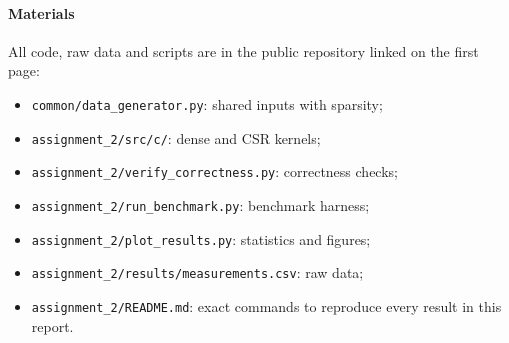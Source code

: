 \documentclass[conference,a4paper]{IEEEtran}
\newcommand{\code}[1]{\texttt{#1}}
\begin{document}
\paragraph{Materials} All code, raw data and scripts are in the public
repository linked on the first page:
\begin{itemize}[itemsep=0pt, topsep=2pt, leftmargin=1.2em]
  \item \code{common/data\_generator.py}: shared inputs with sparsity;
  \item \code{assignment\_2/src/c/}: dense and CSR kernels;
  \item \code{assignment\_2/verify\_correctness.py}: correctness checks;
  \item \code{assignment\_2/run\_benchmark.py}: benchmark harness;
  \item \code{assignment\_2/plot\_results.py}: statistics and figures;
  \item \code{assignment\_2/results/measurements.csv}: raw data;
  \item \code{assignment\_2/README.md}: exact commands to reproduce every
        result in this report.
\end{itemize}
\end{document}
